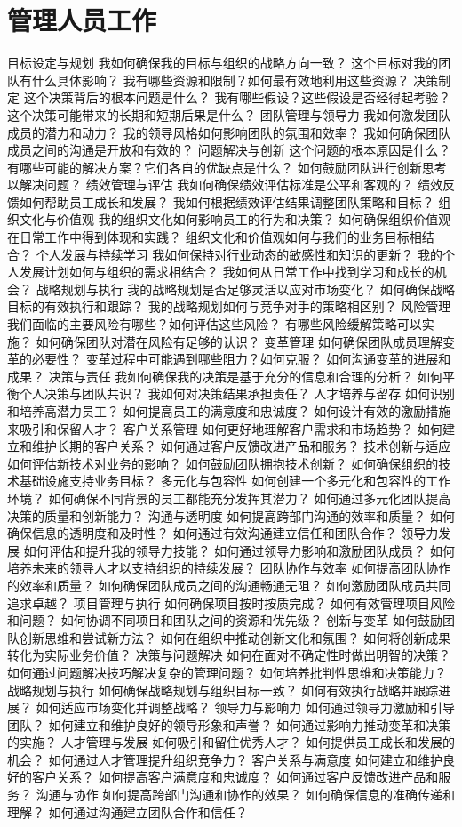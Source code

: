 \documentclass[12pt]{book}
\begin{document}
\section{管理人员工作}
目标设定与规划
我如何确保我的目标与组织的战略方向一致？
这个目标对我的团队有什么具体影响？
我有哪些资源和限制？如何最有效地利用这些资源？
决策制定
这个决策背后的根本问题是什么？
我有哪些假设？这些假设是否经得起考验？
这个决策可能带来的长期和短期后果是什么？
团队管理与领导力
我如何激发团队成员的潜力和动力？
我的领导风格如何影响团队的氛围和效率？
我如何确保团队成员之间的沟通是开放和有效的？
问题解决与创新
这个问题的根本原因是什么？
有哪些可能的解决方案？它们各自的优缺点是什么？
如何鼓励团队进行创新思考以解决问题？
绩效管理与评估
我如何确保绩效评估标准是公平和客观的？
绩效反馈如何帮助员工成长和发展？
我如何根据绩效评估结果调整团队策略和目标？
组织文化与价值观
我的组织文化如何影响员工的行为和决策？
如何确保组织价值观在日常工作中得到体现和实践？
组织文化和价值观如何与我们的业务目标相结合？
个人发展与持续学习
我如何保持对行业动态的敏感性和知识的更新？
我的个人发展计划如何与组织的需求相结合？
我如何从日常工作中找到学习和成长的机会？
战略规划与执行
我的战略规划是否足够灵活以应对市场变化？
如何确保战略目标的有效执行和跟踪？
我的战略规划如何与竞争对手的策略相区别？
风险管理
我们面临的主要风险有哪些？如何评估这些风险？
有哪些风险缓解策略可以实施？
如何确保团队对潜在风险有足够的认识？
变革管理
如何确保团队成员理解变革的必要性？
变革过程中可能遇到哪些阻力？如何克服？
如何沟通变革的进展和成果？
决策与责任
我如何确保我的决策是基于充分的信息和合理的分析？
如何平衡个人决策与团队共识？
我如何对决策结果承担责任？
人才培养与留存
如何识别和培养高潜力员工？
如何提高员工的满意度和忠诚度？
如何设计有效的激励措施来吸引和保留人才？
客户关系管理
如何更好地理解客户需求和市场趋势？
如何建立和维护长期的客户关系？
如何通过客户反馈改进产品和服务？
技术创新与适应
如何评估新技术对业务的影响？
如何鼓励团队拥抱技术创新？
如何确保组织的技术基础设施支持业务目标？
多元化与包容性
如何创建一个多元化和包容性的工作环境？
如何确保不同背景的员工都能充分发挥其潜力？
如何通过多元化团队提高决策的质量和创新能力？
沟通与透明度
如何提高跨部门沟通的效率和质量？
如何确保信息的透明度和及时性？
如何通过有效沟通建立信任和团队合作？
领导力发展
如何评估和提升我的领导力技能？
如何通过领导力影响和激励团队成员？
如何培养未来的领导人才以支持组织的持续发展？
团队协作与效率
如何提高团队协作的效率和质量？
如何确保团队成员之间的沟通畅通无阻？
如何激励团队成员共同追求卓越？
项目管理与执行
如何确保项目按时按质完成？
如何有效管理项目风险和问题？
如何协调不同项目和团队之间的资源和优先级？
创新与变革
如何鼓励团队创新思维和尝试新方法？
如何在组织中推动创新文化和氛围？
如何将创新成果转化为实际业务价值？
决策与问题解决
如何在面对不确定性时做出明智的决策？
如何通过问题解决技巧解决复杂的管理问题？
如何培养批判性思维和决策能力？
战略规划与执行
如何确保战略规划与组织目标一致？
如何有效执行战略并跟踪进展？
如何适应市场变化并调整战略？
领导力与影响力
如何通过领导力激励和引导团队？
如何建立和维护良好的领导形象和声誉？
如何通过影响力推动变革和决策的实施？
人才管理与发展
如何吸引和留住优秀人才？
如何提供员工成长和发展的机会？
如何通过人才管理提升组织竞争力？
客户关系与满意度
如何建立和维护良好的客户关系？
如何提高客户满意度和忠诚度？
如何通过客户反馈改进产品和服务？
沟通与协作
如何提高跨部门沟通和协作的效果？
如何确保信息的准确传递和理解？
如何通过沟通建立团队合作和信任？
\end{document}
